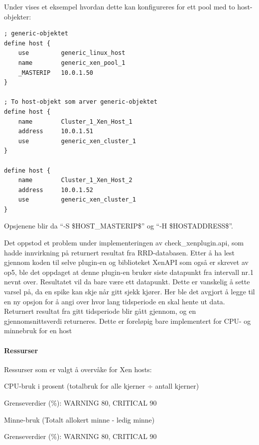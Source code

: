 \clearpage
Under vises et eksempel hvordan dette kan konfigureres for ett pool med to host-objekter:
\begin{lstlisting}[style=example]
; generic-objektet 
define host {
    use         generic_linux_host
    name        generic_xen_pool_1
    _MASTERIP   10.0.1.50
}

; To host-objekt som arver generic-objektet
define host {
    name        Cluster_1_Xen_Host_1
    address     10.0.1.51
    use         generic_xen_cluster_1
}

define host {
    name        Cluster_1_Xen_Host_2
    address     10.0.1.52
    use         generic_xen_cluster_1
}
\end{lstlisting}

Opsjenene blir da ``-S \$HOST\_MASTERIP\$'' og ``-H \$HOSTADDRESS\$''.

Det oppstod et problem under implementeringen av check\_xenplugin.api, som hadde innvirkning på returnert resultat fra RRD-databasen. Etter å ha lest gjennom koden til selve plugin-en og biblioteket XenAPI som også er skrevet av op5, ble det oppdaget at denne plugin-en bruker siste datapunkt fra intervall nr.1 nevnt over. Resultatet vil da bare være ett datapunkt. Dette er vanskelig å sette varsel på, da en spike kan skje når gitt sjekk kjører. Her ble det avgjort å legge til en ny opsjon for å angi over hvor lang tidsperiode en skal hente ut data. Returnert resultat fra gitt tidsperiode blir gått gjennom, og en gjennomsnittsverdi returneres. Dette er foreløpig bare implementert for CPU- og minnebruk for en host


\paragraph{Ressurser}
Ressurser som er valgt å overvåke for Xen hosts:
\begin{itemize*}
        \item CPU-bruk i prosent (totalbruk for alle kjerner ÷ antall kjerner)
        \begin{itemize*}
                \item Grenseverdier (\%): WARNING 80, CRITICAL 90
        \end{itemize*}
        \item Minne-bruk (Totalt allokert minne - ledig minne)
        \begin{itemize*}
                \item Grenseverdier (\%): WARNING 80, CRITICAL 90
        \end{itemize*}
\end{itemize*}

